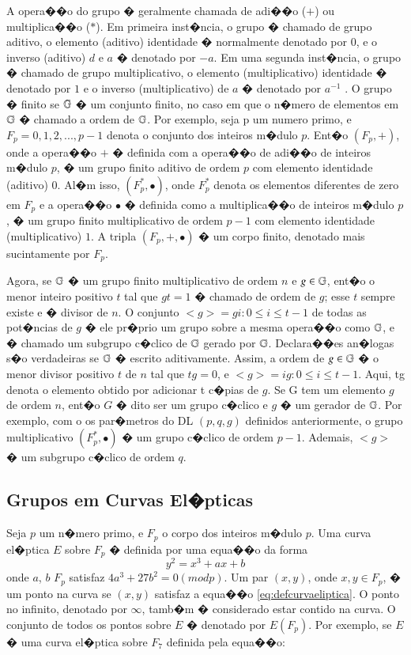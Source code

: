 \documentclass[a4paper,capchap,espacoduplo,normaltoc]{abntepusp}
\begin{document}
A opera��o do grupo � geralmente chamada de adi��o ($+$) ou multiplica��o ($*$). Em primeira inst�ncia, o grupo � chamado de grupo aditivo, o elemento (aditivo) identidade � normalmente denotado por $0$, e o inverso (aditivo) $d$ e $a$ � denotado por $-a$. Em uma segunda inst�ncia, o grupo � chamado de grupo multiplicativo, o elemento (multiplicativo) identidade � denotado por $1$ e o inverso (multiplicativo) de $a$ � denotado por $a^{-1}$ .
O grupo � finito se $\mathbb{G}$ � um conjunto finito, no caso em que o n�mero de elementos em $\mathbb{G}$ � chamado a ordem de $\mathbb{G}$.
Por exemplo, seja p um numero primo, e $F_{p} = {0,1,2,...,p-1}$ denota o conjunto dos inteiros m�dulo $p$. Ent�o $(F_{p},+)$, onde a opera��o $+$ � definida com a opera��o de adi��o de inteiros m�dulo $p$, � um grupo finito aditivo de ordem $p$ com elemento identidade (aditivo) $0$. Al�m isso, $(F^{*}_{p},\bullet)$, onde $F^{*}_{p}$ denota os elementos diferentes de zero em $F_{p}$ e a opera��o $\bullet$ � definida como a multiplica��o de inteiros m�dulo $p$, � um grupo finito multiplicativo de ordem $p-1$ com elemento identidade (multiplicativo) $1$. A tripla $(F_{p}, + , \bullet)$ � um corpo finito, denotado mais sucintamente por $F_{p}$.

Agora, se $\mathbb{G}$ � um grupo finito multiplicativo de ordem $n$ e $g \in \mathbb{G}$, ent�o o menor inteiro positivo $t$ tal que $gt = 1$ � chamado de ordem de $g$; esse $t$ sempre existe e � divisor de $n$. O conjunto $<g> = {gi : 0 \leq i \leq t-1}$ de todas as pot�ncias de $g$ � ele pr�prio um grupo sobre a mesma opera��o como $\mathbb{G}$, e � chamado um subgrupo c�clico de $\mathbb{G}$ gerado por $\mathbb{G}$. Declara��es an�logas s�o verdadeiras se $\mathbb{G}$ � escrito aditivamente. Assim, a ordem de $g \in \mathbb{G}$ � o menor divisor positivo $t$ de $n$ tal que $tg = 0$, e $<g> = {ig : 0 \leq i \leq t-1}$. Aqui, tg denota o elemento obtido por adicionar t c�pias de $g$. Se G tem um elemento $g$ de ordem $n$, ent�o $G$ � dito ser um grupo c�clico e $g$ � um gerador de $\mathbb{G}$. Por exemplo, com o os par�metros do DL $(p,q,g)$ definidos anteriormente, o grupo multiplicativo $(F^{*}_{p}, \bullet)$ � um grupo c�clico de ordem $p-1$. Ademais, $<g>$ � um subgrupo c�clico de ordem $q$.

\subsection{Grupos em Curvas El�pticas}

Seja $p$ um n�mero primo, e $F_{p}$ o corpo dos inteiros m�dulo $p$. Uma curva el�ptica $E$ sobre $F_{p}$ � definida por uma equa��o da forma 
\begin{equation}
\label{eq:defcurvaeliptica}
y^2= x^3+ ax+b
\end{equation}
onde $a$, $b$   $F_{p}$ satisfaz $4a^{3}+ 27b^{2}=0 (mod p)$. Um par $(x, y)$, onde $x, y \in F_{p}$, � um ponto na curva se $(x, y)$ satisfaz a equa��o \ref{eq:defcurvaeliptica}. O ponto no infinito, denotado por $\infty$, tamb�m � considerado estar contido na curva. O conjunto de todos os pontos sobre $E$ � denotado por $E(F_{p})$. Por exemplo, se $E$ � uma curva el�ptica sobre $F_{7}$ definida pela equa��o:
\end{document}
